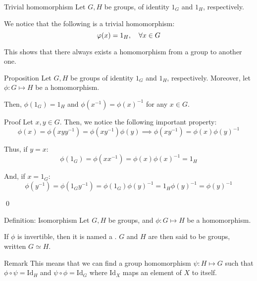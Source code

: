 \documentclass[a4paper]{article}
\begin{document}
\begin{parag}{Trivial homomorphism}
    Let $G, H$ be groups, of identity $1_G$ and $1_H$, respectively.

    We notice that the following is a trivial homomorphism: 
    \[\phi\left(x\right) = 1_H, \mathspace \forall x \in G\]
    
    This shows that there always exists a homomorphism from a group to another one.
\end{parag}


\begin{parag}{Proposition}
    Let $G, H$ be groups of identity $1_G$ and $1_H$, respectively. Moreover, let $\phi: G \mapsto H$ be a homomorphism.

    Then, $\phi\left(1_G\right) = 1_H$ and $\phi\left(x^{-1}\right) = \phi\left(x\right)^{-1}$ for any $x \in G$.

    \begin{subparag}{Proof}
        Let $x, y \in G$. Then, we notice the following important property: 
        \[\phi\left(x\right) = \phi\left(x y y^{-1}\right) = \phi\left(x y^{-1}\right)  \phi\left(y\right) \implies \phi\left(xy^{-1}\right) = \phi\left(x\right)\phi\left(y\right)^{-1}\]
        
        Thus, if $y = x$: 
        \[\phi\left(1_G\right) = \phi\left(x x^{-1}\right) = \phi\left(x\right)\phi\left(x\right)^{-1} = 1_H\]
        
        And, if $x = 1_G$: 
        \[\phi\left(y^{-1}\right) = \phi\left(1_G y^{-1}\right) = \phi\left(1_G\right)\phi\left(y\right)^{-1} = 1_H\phi\left(y\right)^{-1} = \phi\left(y\right)^{-1}\]
        
        \qed
    \end{subparag}
\end{parag}

\begin{parag}{Definition: Isomorphism}
    Let $G, H$ be groups, and $\phi: G \mapsto H$ be a homomorphism.

    If $\phi$ is invertible, then it is named a . $G$ and $H$ are then said to be  groups, written $G \simeq H$.
    
    \begin{subparag}{Remark}
        This means that we can find a group homomorphism $\psi: H \mapsto G$ such that $\phi \circ \psi = \text{Id}_H$ and $\psi \circ \phi = \text{Id}_G$ where $\text{Id}_X$ maps an element of $X$ to itself.
    \end{subparag}
\end{parag}
\end{document}
